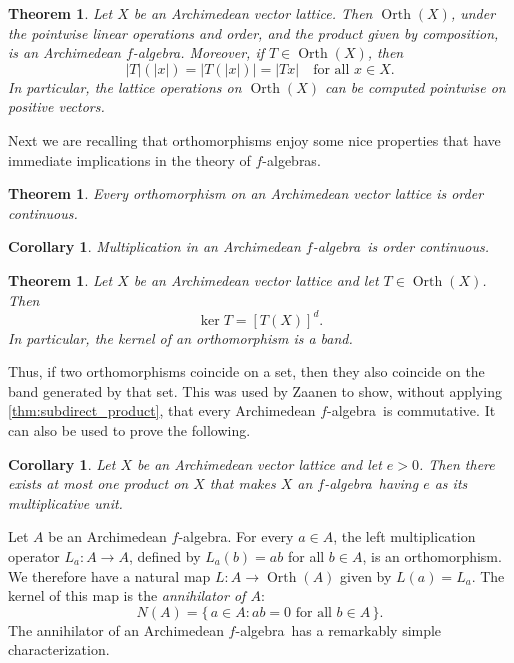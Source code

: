 \documentclass{memo-l}
\newtheorem{thm}[theorem]{Theorem}
\newtheorem{cor}[theorem]{Corollary}
\theoremstyle{definition}
\theoremstyle{remark}
\numberwithin{section}{chapter}
\numberwithin{equation}{chapter}
\newcommand{\falg}{$f\!$-algebra}
\newcommand{\orth}[1]{\operatorname{Orth}(#1)}
\begin{document}
\begin{thm}
    Let $X$ be an Archimedean vector lattice. Then $\orth X$, under
    the pointwise linear operations and order, and the product given by composition, is an Archimedean \falg. Moreover, if $T \in \orth X$,
    then
    \[
    |T|(|x|)=|T(|x|)|=|Tx|\quad\text{for all }x \in X.
    \]
    In particular, the lattice operations on $\orth X$ can be computed pointwise on
    positive vectors.
\end{thm}

Next we are recalling that orthomorphisms enjoy some nice properties
that have immediate implications in the theory of \falg s.

\begin{thm}
    Every orthomorphism on an Archimedean vector lattice is order
    continuous.
\end{thm}

\begin{cor}
    Multiplication in an Archimedean \falg\ is order continuous.
\end{cor}

\begin{thm}
    Let $X$ be an Archimedean vector lattice and let $T \in \orth X$.
    Then
    \[
        \ker T = [T(X)]^{d}.
    \]
    In particular, the kernel of an orthomorphism is a band.
\end{thm}

Thus, if two orthomorphisms coincide on a set, then they also coincide
on the band generated by that set. This was used by Zaanen
\cite{zaanen1975} to show, without applying \cref{thm:subdirect_product}, that every Archimedean \falg\ is commutative. It can also be used to prove the following.

\begin{cor}
    Let $X$ be an Archimedean vector lattice and let $e>0$. Then there
    exists at most one product on $X$ that makes $X$ an \falg\ having
    $e$ as its multiplicative unit.
\end{cor}

Let $A$ be an Archimedean \falg. For every $a \in A$, the left
multiplication operator $L_a\colon A\to A$, defined by $L_a(b)=ab$ for all
$b \in A$, is an orthomorphism. We therefore have a natural map $L\colon A\to
\orth A$ given by $L(a)=L_a$. The kernel of this map is the
\emph{annihilator of $A$}:
\[
N(A)=\{\, a \in A : ab=0\text{ for all }b \in A \, \}.
\]
The annihilator of an Archimedean \falg\ has a remarkably simple
characterization.
\end{document}
